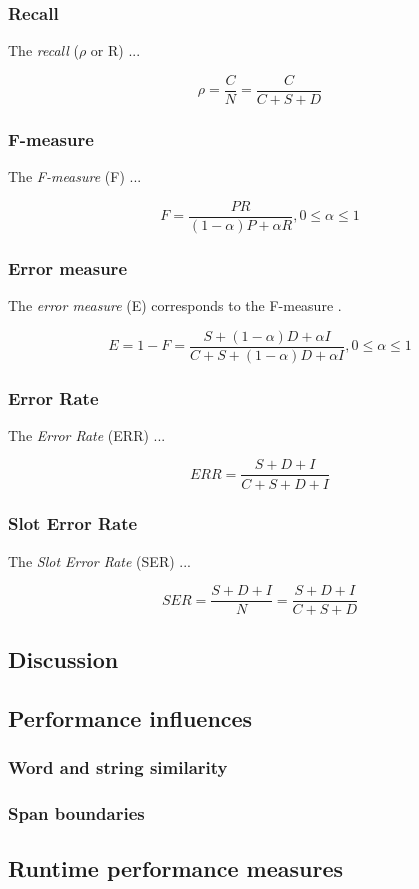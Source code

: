\subsubsection{Recall}
The \textit{recall} (\ensuremath{\rho} or R) ...

\begin{displaymath}
	\rho = \frac{C}{N} = \frac{C}{C+S+D}
\end{displaymath}

\subsubsection{F-measure}
The \textit{F-measure} (F) ...

\begin{displaymath}
	F = \frac{PR}{(1-\alpha)P + {\alpha}R}, 0\le\alpha{\le}1
\end{displaymath}

\subsubsection{Error measure}
The \textit{error measure} (E) corresponds to the F-measure \cite{Feilmayr:2012}.

\begin{displaymath}
	E = 1-F = \frac{S+(1-\alpha)D+{\alpha}I}{C+S+(1-\alpha)D+{\alpha}I}, 0\le\alpha{\le}1
\end{displaymath}

\subsubsection{Error Rate}
The \textit{Error Rate} (ERR) ...

\begin{displaymath}
	ERR = \frac{S+D+I}{C+S+D+I}
\end{displaymath}

\subsubsection{Slot Error Rate}
The \textit{Slot Error Rate} (SER) ... 

\begin{displaymath}
	SER = \frac{S+D+I}{N} = \frac{S+D+I}{C+S+D}
\end{displaymath}

\subsection{Discussion}

\subsection{Performance influences}

\subsubsection{Word and string similarity}
\subsubsection{Span boundaries}

\subsection{Runtime performance measures}